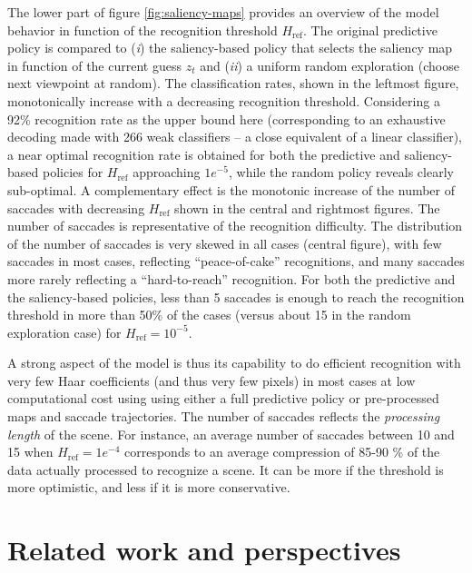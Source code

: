 \documentclass{article}
\begin{document}


The lower part of figure \ref{fig:saliency-maps} provides an overview of the model behavior in function of the recognition threshold $H_\text{ref}$. The original predictive policy is compared to (\textit{i}) the saliency-based policy that selects the saliency map in function of the current guess $z_t$ and (\textit{ii}) a uniform random exploration (choose next viewpoint at random). The classification rates, shown in the leftmost figure, monotonically increase with a decreasing recognition threshold. Considering a 92\% recognition rate as the upper bound here (corresponding to an exhaustive decoding made with 266 weak classifiers -- a close equivalent of a linear classifier), a near optimal recognition rate is obtained for both the predictive and saliency-based policies for $H_\text{ref}$ approaching $1e^{-5}$, while the random policy reveals clearly sub-optimal. A complementary effect is the monotonic increase of the number of saccades with decreasing $H_\text{ref}$ shown in the central and rightmost figures. The number of saccades is representative of the recognition difficulty. The distribution of the number of saccades is very skewed in all cases (central figure), with few saccades in most cases, reflecting ``peace-of-cake'' recognitions, and many saccades more rarely reflecting a ``hard-to-reach'' recognition. For both the predictive and the saliency-based policies, less than 5 saccades is enough to reach the recognition threshold in more than 50\% of the cases (versus about 15 in the random exploration case) for $H_\text{ref} = 10^{-5}$.  

A strong aspect of the model is thus its capability to do efficient recognition with very few Haar coefficients (and thus very few pixels) in most cases at low computational cost using using either a full predictive policy or pre-processed maps and saccade trajectories. The number of saccades  reflects the \textit{processing length} of the scene.  
For instance, an average number of saccades between 10 and 15 when $H_\text{ref} = 1e^{-4}$ corresponds to an average compression of 85-90 \% of the data actually processed to recognize a scene. It can be more if the threshold is more optimistic, and less if it is more conservative.   

\section{Related work and perspectives}
\end{document}
